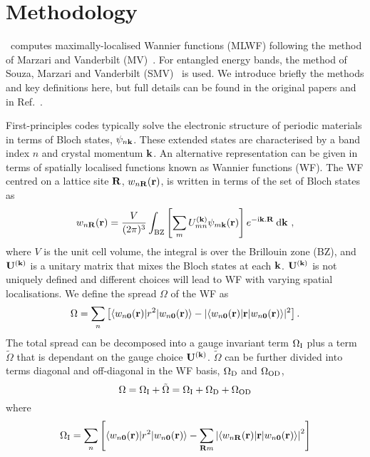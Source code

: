 \chapter{Methodology}\label{sec:method}
\wannier\ computes maximally-localised Wannier functions (MLWF)
following the method of Marzari and Vanderbilt
(MV)~\cite{marzari-prb97}.  For entangled energy bands, the method of
Souza, Marzari and Vanderbilt (SMV)~\cite{souza-prb01} is used. We
introduce briefly the methods and key definitions here, but full
details can be found in the original papers and in
Ref.~\cite{mostofi-cpc08}.

First-principles codes typically solve the electronic structure of
periodic materials in terms of Bloch states, $\psi_{n{\bf k}}$.
These extended states are characterised by a band index $n$ and crystal
momentum ${\bf k}$. An alternative representation can be given in terms
of spatially localised functions known as Wannier functions (WF). The WF
centred on a lattice site ${\bf R}$, $w_{n{\bf R}}({\bf r})$,
is written in terms of the set of Bloch states as
\begin{equation}
w_{n{\bf R}}({\bf r})=\frac{V}{(2\pi)^3}\int_{\mathrm{BZ}}
\left[\sum_{m} U^{({\bf k})}_{mn} \psi_{m{\bf k}}({\bf
    r})\right]e^{-\mathrm{i}{\bf k}.{\bf R}} \:\mathrm{d}{\bf k} \ ,
\end{equation}
where $V$ is the unit cell volume, the integral is over the Brillouin
zone (BZ), and $\mathbf{U}^{(\mathbf{k})}$ is a unitary matrix that mixes the Bloch
states at each ${\bf k}$. $\mathbf{U}^{(\mathbf{k})}$ is not uniquely defined and different
choices will lead to WF with varying spatial localisations. We define
the spread $\Omega$ of the WF as
\begin{equation}
\Omega=\sum_n \left[\langle w_{n{\bf 0}}({\bf r})| r^2 | w_{n{\bf
      0}}({\bf r}) \rangle - | \langle w_{n{\bf 0}}({\bf r})| {\bf r}
      | w_{n{\bf 0}}({\bf r}) \rangle |^2 \right].
\end{equation}
The total spread can be decomposed into a gauge invariant term
$\Omega_{\rm I}$ plus a term ${\tilde \Omega}$ that is dependant on the gauge
choice $\mathbf{U}^{(\mathbf{k})}$. ${\tilde \Omega}$ can
be further divided into terms diagonal and off-diagonal in the WF basis,
$\Omega_{\rm D}$ and $\Omega_{\rm OD}$,
\begin{equation}
\Omega=\Omega_{\rm I}+{\tilde \Omega}=\Omega_{\rm I}+\Omega_{\rm
  D}+\Omega_{\rm OD}
\end{equation}
where
\begin{equation}
\Omega_{{\rm I}}=\sum_n \left[\langle w_{n{\bf 0}}({\bf r})| r^2 | w_{n{\bf
      0}}({\bf r}) \rangle - \sum_{{\bf R}m} \left| \langle w_{n{\bf
      R}}({\bf r})| {\bf r} | w_{n{\bf 0}}({\bf r}) \rangle \right| ^2
      \right]
\end{equation}
